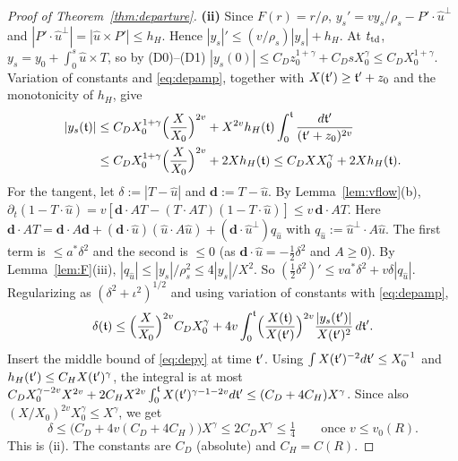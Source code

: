 \begin{proof}[Proof of Theorem~\ref{thm:departure}]
\textbf{(ii)} Since $F(r)=r/\rho$, $y_s'=vy_s/\rho_s-P'\cdot\hat u^\perp$ and $|P'\cdot\hat u^\perp|=|\hat u\times P'|\le h_H$.
Hence $|y_s|'\le(v/\rho_s)|y_s|+h_H$. At $t_{\mathrm{td}}$, $y_s=y_0+\int_0^s\hat u\times T$, so by (D0)--(D1)
$|y_s(0)|\le C_Dz_0^{1+\gamma}+C_DsX_0^\gamma\le C_DX_0^{1+\gamma}$. Variation of constants and \eqref{eq:depamp},
together with $X(\mathfrak{t}')\ge\mathfrak{t}'+z_0$ and the monotonicity of $h_H$, give
\begin{equation}\label{eq:depy}
\begin{aligned}
|y_s(\mathfrak{t})|&\le C_DX_0^{1+\gamma}\Bigl(\frac X{X_0}\Bigr)^{2v}+X^{2v}h_H(\mathfrak{t})\int_0^{\mathfrak{t}}\frac{d\mathfrak{t}'}{(\mathfrak{t}'+z_0)^{2v}}\\
&\le C_DX_0^{1+\gamma}\Bigl(\frac X{X_0}\Bigr)^{2v}+2Xh_H(\mathfrak{t})\le C_DXX_0^\gamma+2Xh_H(\mathfrak{t}).
\end{aligned}
\end{equation}
For the tangent, let $\delta:=|T-\hat u|$ and $\mathbf d:=T-\hat u$. By Lemma~\ref{lem:vflow}(b),
$\partial_t(1-T\cdot\hat u)=v[\mathbf d\cdot AT-(T\cdot AT)(1-T\cdot\hat u)]\le v\,\mathbf d\cdot AT$. Here
$\mathbf d\cdot AT=\mathbf d\cdot A\mathbf d+(\mathbf d\cdot\hat u)(\hat u\cdot A\hat u)+(\mathbf d\cdot\hat u^\perp)q_{\hat u}$ with
$q_{\hat u}:=\hat u^\perp\cdot A\hat u$. The first term is $\le a^*\delta^2$ and the second is $\le0$ (as
$\mathbf d\cdot\hat u=-\frac12\delta^2$ and $A\ge0$). By Lemma~\ref{lem:F}(iii), $|q_{\hat u}|\le|y_s|/\rho_s^2\le4|y_s|/X^2$.
So $(\frac12\delta^2)'\le va^*\delta^2+v\delta|q_{\hat u}|$. Regularizing as $(\delta^2+\iota^2)^{1/2}$ and using variation of
constants with \eqref{eq:depamp},
\[
\delta(\mathfrak{t})\le\Bigl(\frac X{X_0}\Bigr)^{2v}C_DX_0^\gamma+4v\int_0^{\mathfrak{t}}\Bigl(\frac{X(\mathfrak{t})}{X(\mathfrak{t}')}\Bigr)^{2v}\frac{|y_s(\mathfrak{t}')|}{X(\mathfrak{t}')^2}\,d\mathfrak{t}'.
\]
Insert the middle bound of \eqref{eq:depy} at time $\mathfrak{t}'$. Using $\int X(\mathfrak{t}')^{-2}d\mathfrak{t}'\le X_0^{-1}$ and
$h_H(\mathfrak{t}')\le C_HX(\mathfrak{t}')^\gamma$, the integral is at most
$C_DX_0^{\gamma-2v}X^{2v}+2C_HX^{2v}\int_0^{\mathfrak{t}}X(\mathfrak{t}')^{\gamma-1-2v}d\mathfrak{t}'\le(C_D+4C_H)X^\gamma$. Since also
$(X/X_0)^{2v}X_0^\gamma\le X^\gamma$, we get
\begin{equation}\label{eq:depT}
\delta\le\bigl(C_D+4v(C_D+4C_H)\bigr)X^\gamma\le2C_DX^\gamma\le\tfrac14\qquad\text{once }v\le v_0(R).
\end{equation}
This is (ii). The constants are $C_D$ (absolute) and $C_H=C(R)$.


\end{proof}
